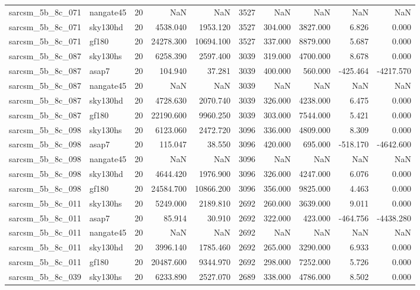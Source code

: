 \begin{tabular}{llrrrrrrrr}
sarcsm\_5b\_8c\_071 & nangate45 & 20 & NaN & NaN & 3527 & NaN & NaN & NaN & NaN \\
sarcsm\_5b\_8c\_071 & sky130hd & 20 & 4538.040 & 1953.120 & 3527 & 304.000 & 3827.000 & 6.826 & 0.000 \\
sarcsm\_5b\_8c\_071 & gf180 & 20 & 24278.300 & 10694.100 & 3527 & 337.000 & 8879.000 & 5.687 & 0.000 \\
sarcsm\_5b\_8c\_087 & sky130hs & 20 & 6258.390 & 2597.400 & 3039 & 319.000 & 4700.000 & 8.678 & 0.000 \\
sarcsm\_5b\_8c\_087 & asap7 & 20 & 104.940 & 37.281 & 3039 & 400.000 & 560.000 & -425.464 & -4217.570 \\
sarcsm\_5b\_8c\_087 & nangate45 & 20 & NaN & NaN & 3039 & NaN & NaN & NaN & NaN \\
sarcsm\_5b\_8c\_087 & sky130hd & 20 & 4728.630 & 2070.740 & 3039 & 326.000 & 4238.000 & 6.475 & 0.000 \\
sarcsm\_5b\_8c\_087 & gf180 & 20 & 22190.600 & 9960.250 & 3039 & 303.000 & 7544.000 & 5.421 & 0.000 \\
sarcsm\_5b\_8c\_098 & sky130hs & 20 & 6123.060 & 2472.720 & 3096 & 336.000 & 4809.000 & 8.309 & 0.000 \\
sarcsm\_5b\_8c\_098 & asap7 & 20 & 115.047 & 38.550 & 3096 & 420.000 & 695.000 & -518.170 & -4642.600 \\
sarcsm\_5b\_8c\_098 & nangate45 & 20 & NaN & NaN & 3096 & NaN & NaN & NaN & NaN \\
sarcsm\_5b\_8c\_098 & sky130hd & 20 & 4644.420 & 1976.900 & 3096 & 326.000 & 4247.000 & 6.076 & 0.000 \\
sarcsm\_5b\_8c\_098 & gf180 & 20 & 24584.700 & 10866.200 & 3096 & 356.000 & 9825.000 & 4.463 & 0.000 \\
sarcsm\_5b\_8c\_011 & sky130hs & 20 & 5249.000 & 2189.810 & 2692 & 260.000 & 3639.000 & 9.011 & 0.000 \\
sarcsm\_5b\_8c\_011 & asap7 & 20 & 85.914 & 30.910 & 2692 & 322.000 & 423.000 & -464.756 & -4438.280 \\
sarcsm\_5b\_8c\_011 & nangate45 & 20 & NaN & NaN & 2692 & NaN & NaN & NaN & NaN \\
sarcsm\_5b\_8c\_011 & sky130hd & 20 & 3996.140 & 1785.460 & 2692 & 265.000 & 3290.000 & 6.933 & 0.000 \\
sarcsm\_5b\_8c\_011 & gf180 & 20 & 20487.600 & 9344.970 & 2692 & 298.000 & 7252.000 & 5.726 & 0.000 \\
sarcsm\_5b\_8c\_039 & sky130hs & 20 & 6233.890 & 2527.070 & 2689 & 338.000 & 4786.000 & 8.502 & 0.000 \\

\end{tabular}
